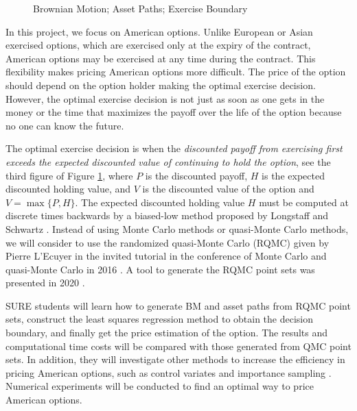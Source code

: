 \begin{figure}
\begin{center}
  \end{center}
  \caption{Brownian Motion; Asset Paths; Exercise Boundary}
  \label{fig:bmandassetpath}
\end{figure}


In this project, we focus on American options. Unlike European or Asian exercised options, which are exercised only at the expiry of the contract, American options may be exercised at any time during the contract. This flexibility makes pricing American options more difficult. The price of the option should depend on the option holder making the optimal exercise decision. However, the optimal exercise decision is not just as soon as one gets in the money or the time that maximizes the payoff over the life of the option because no one can know the future.

The optimal exercise decision is when the \emph{discounted payoff from exercising first exceeds the expected discounted value of continuing to hold the option}, see the third figure of Figure \ref{fig:bmandassetpath}, where $P$ is the discounted payoff, $H$ is the expected discounted holding value, and $V$ is the discounted value of the option and $V = \max\{P,H\}$. The expected discounted holding value $H$ must be computed at discrete times backwards by a biased-low method proposed by
Longstaff and Schwartz \cite{LonSch01}.
Instead of using Monte Carlo methods or quasi-Monte Carlo methods, we will consider to use the randomized quasi-Monte Carlo (RQMC) given by Pierre L'Ecuyer in the invited tutorial in the conference of Monte Carlo and quasi-Monte Carlo in 2016 \cite{RQMC}. A tool to generate the RQMC point sets was presented in 2020 \cite{toolforRQMC}. 



SURE students will learn how to generate BM and asset paths from RQMC point sets, construct the least squares regression method to obtain the decision boundary, and finally get the price estimation of the option. The results and computational time costs will be compared with those generated from QMC point sets. In addition, they will investigate other methods to increase the efficiency in pricing American options, such as control variates and importance sampling  \cite{NickiCV,ISref1,ISref2,ISref3}. Numerical experiments will be conducted to find an optimal way to price American options.








